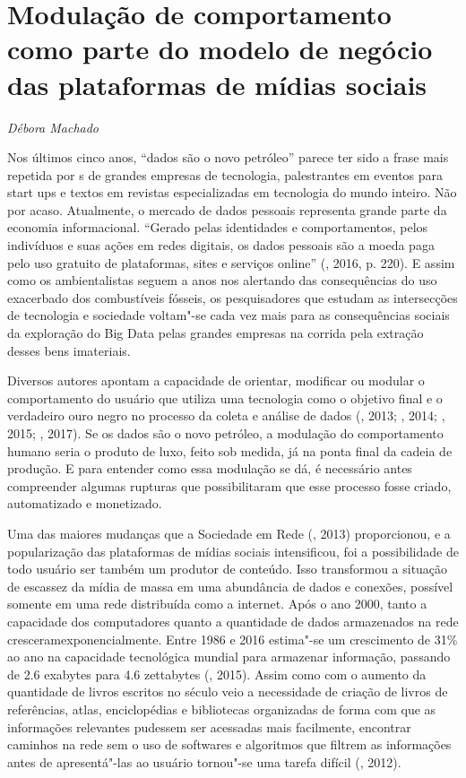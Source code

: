 \chapter{Modulação de comportamento como parte do modelo de negócio das
plataformas de mídias sociais}

\begin{flushright}
\emph{Débora Machado}
\end{flushright}

Nos últimos cinco anos, ``dados são o novo petróleo'' parece ter sido a
frase mais repetida por s de grandes empresas de tecnologia,
palestrantes em eventos para start ups e textos em revistas
especializadas em tecnologia do mundo inteiro. Não por acaso.
Atualmente, o mercado de dados pessoais representa grande parte da
economia informacional. ``Gerado pelas identidades e comportamentos,
pelos indivíduos e suas ações em redes digitais, os dados pessoais são a
moeda paga pelo uso gratuito de plataformas, sites e serviços online''
(, 2016, p. 220). E assim como os ambientalistas
seguem a anos nos alertando das consequências do uso exacerbado dos
combustíveis fósseis, os pesquisadores que estudam as intersecções de
tecnologia e sociedade voltam"-se cada vez mais para as consequências
sociais da exploração do Big Data pelas grandes empresas na corrida pela
extração desses bens imateriais.

Diversos autores apontam a capacidade de orientar, modificar ou modular
o comportamento do usuário que utiliza uma tecnologia como o objetivo
final e o verdadeiro ouro negro no processo da coleta e análise de dados
(, 2013; , 2014; , 2015; , 2017). Se os dados são o novo petróleo, a modulação do comportamento humano seria o
produto de luxo, feito sob medida, já na ponta final da cadeia de
produção. E para entender como essa modulação se dá, é necessário antes
compreender algumas rupturas que possibilitaram que esse processo fosse
criado, automatizado e monetizado.

Uma das maiores mudanças que a Sociedade em Rede (, 2013)
proporcionou, e a popularização das plataformas de mídias sociais
intensificou, foi a possibilidade de todo usuário ser também um produtor
de conteúdo. Isso transformou a situação de escassez da mídia de massa
em uma abundância de dados e conexões, possível somente em uma rede
distribuída como a internet. Após o ano 2000, tanto a capacidade dos
computadores quanto a quantidade de dados armazenados na rede
cresceramexponencialmente. Entre 1986 e 2016 estima"-se um crescimento de
31\% ao ano na capacidade tecnológica mundial para armazenar informação,
passando de 2.6 exabytes para 4.6 zettabytes (, 2015). Assim como
com o aumento da quantidade de livros escritos no século  veio a
necessidade de criação de livros de referências, atlas, enciclopédias e
bibliotecas organizadas de forma com que as informações relevantes
pudessem ser acessadas mais facilmente, encontrar caminhos na rede sem o
uso de softwares e algoritmos que filtrem as informações antes de
apresentá"-las ao usuário tornou"-se uma tarefa difícil (, 2012).

